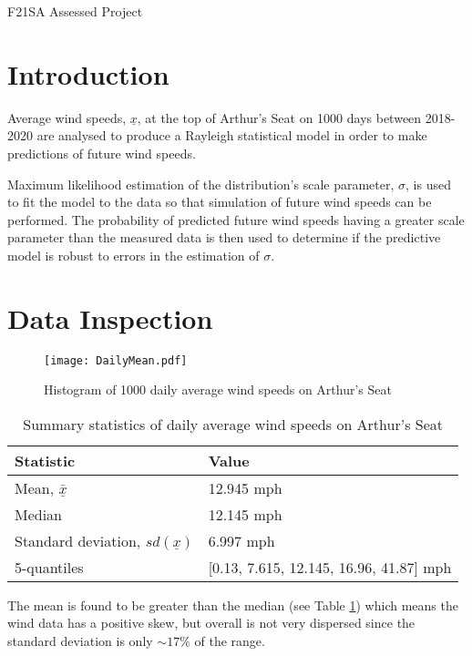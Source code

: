 \documentclass[11pt]{article}
\begin{document}
\begin{center}
    \Large{F21SA Assessed Project}
\end{center}

\section{Introduction}

Average wind speeds, $\underline{x}$, at the top of Arthur's Seat on 1000
days between 2018-2020 are analysed to produce a Rayleigh statistical
model in order to make predictions of future wind speeds.

Maximum likelihood estimation of the distribution's scale parameter,
$\sigma$, is used to fit the model to the data so that simulation of
future wind speeds can be performed. The probability of predicted future
wind speeds having a greater scale parameter than the measured data is
then used to determine if the predictive model is robust to errors in
the estimation of $\sigma$.


\section{Data Inspection}

\begin{figure}[ht]
    \centering
	\texttt{[image: DailyMean.pdf]}
    \caption{Histogram of 1000 daily average wind speeds on Arthur's Seat}
    \label{fig:histogram}
\end{figure}


\begin{table}[ht]
    \centering
    \begin{tabular}{ll}
    Statistic & Value \\ \hline
    Mean, $\underline{\bar x}$ & 12.945 mph \\
    Median & 12.145 mph \\
    Standard deviation, $sd(\underline{x})$ & 6.997 mph \\
    5-quantiles & [0.13, 7.615, 12.145, 16.96, 41.87] mph
    \end{tabular}
    \caption{Summary statistics of daily average wind speeds on Arthur's Seat}
    \label{t:data}
\end{table}

The mean is found to be greater than the median (see Table \ref{t:data})
which means the wind data has a positive skew, but overall is not very dispersed
since the standard deviation is only $\sim17\%$ of the range.
\end{document}
